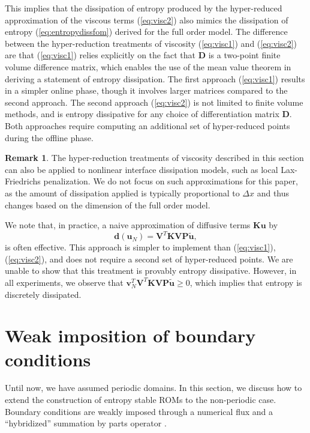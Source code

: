 \documentclass[preprint,10pt]{elsarticle}
\theoremstyle{definition}
\theoremstyle{lemma}
\newtheorem*{remark}{Remark}
\theoremstyle{theorem}
\theoremstyle{assumption}
\renewcommand{\tilde}{\widetilde}
\begin{document}
This implies that the dissipation of entropy produced by the hyper-reduced approximation of the viscous terms (\ref{eq:visc2}) also mimics the dissipation of entropy (\ref{eq:entropydissfom}) derived for the full order model.
The difference between the hyper-reduction treatments of viscosity (\ref{eq:visc1}) and (\ref{eq:visc2}) are that (\ref{eq:visc1}) relies explicitly on the fact that $\bm{D}$ is a two-point finite volume difference matrix, which enables the use of the mean value theorem in deriving a statement of entropy dissipation.   The first approach (\ref{eq:visc1}) results in a simpler online phase, though it involves larger matrices compared to the second approach.  The second approach (\ref{eq:visc2}) is not limited to finite volume methods, and is entropy dissipative for any choice of differentiation matrix $\bm{D}$.  Both approaches require computing an additional set of hyper-reduced points during the offline phase.  

\begin{remark}
The hyper-reduction treatments of viscosity described in this section can also be applied to nonlinear interface dissipation models, such as local Lax-Friedrichs penalization.  We do not focus on such approximations for this paper, as the amount of dissipation applied is typically proportional to $\Delta x$ and thus changes based on the dimension of the full order model.
\end{remark}

We note that, in practice, a naive approximation of diffusive terms $\bm{K}\bm{u}$ by
\begin{equation}
\bm{d}(\bm{u}_N) = \bm{V}^T\bm{K}\bm{V}\bm{P}\tilde{\bm{u}},
\label{eq:visc3}
\end{equation}
is often effective.  This approach is simpler to implement than (\ref{eq:visc1}), (\ref{eq:visc2}), and does not require a second set of hyper-reduced points.  We are unable to show that this treatment is provably entropy dissipative.  However, in all experiments, we observe that $\bm{v}_N^T\bm{V}^T\bm{K}\bm{V}\bm{P}\tilde{\bm{u}} \geq 0$, which implies that entropy is discretely dissipated.  



\section{Weak imposition of boundary conditions}
\label{sec:6}
Until now, we have assumed periodic domains.  In this section, we discuss how to extend the construction of entropy stable ROMs to the non-periodic case.  Boundary conditions are weakly imposed through a numerical flux and a ``hybridized'' summation by parts operator \cite{chan2017discretely}.  
\end{document}
